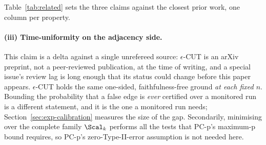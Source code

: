 Table~\ref{tab:related} sets the three claims against the closest prior work,
one column per property.

\paragraph{(iii) Time-uniformity on the adjacency side.} This claim is a delta
against a single unrefereed source: $\epsilon$-CUT \citep{shaska2025causal} is
an arXiv preprint, not a peer-reviewed publication, at the time of writing,
and a special issue's review lag is long enough that its status could change
before this paper appears. $\epsilon$-CUT holds the same one-sided,
faithfulness-free ground \emph{at each fixed $n$}. Bounding the probability
that a false edge is
\emph{ever} certified over a monitored run is a different statement, and it is
the one a monitored run needs; Section~\ref{sec:exp-calibration} measures the
size of the gap. Secondarily, minimising over the complete family $\Scal_k$
performs all the tests that PC-p's maximum-p bound requires, so PC-p's
zero-Type-II-error assumption is not needed here.

